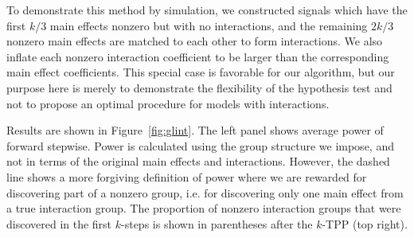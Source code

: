 \documentclass{imsart}
\begin{document}
To demonstrate this method by simulation, we constructed signals which have
the first $k/3$ main effects nonzero but with no interactions, and the
remaining $2k/3$ nonzero main effects are matched to each other to form
interactions.
We also inflate each nonzero interaction
coefficient to be larger than the corresponding main
effect coefficients. This special case is favorable for our algorithm,
but our purpose here is merely to demonstrate the flexibility of the
hypothesis test and not to propose an optimal procedure for models with
interactions.

Results are shown in Figure~\ref{fig:glint}. The left
panel shows average power of forward stepwise. Power is calculated
using the group structure we impose, and not in terms of the original
main effects and interactions. However, the dashed line shows a more
forgiving definition of power where we are rewarded for discovering part
of a nonzero group, i.e. for discovering only one main effect from a
true interaction group. The proportion of nonzero interaction groups
that were discovered in the first $k$-steps is shown in parentheses
after the $k$-TPP (top right).
\end{document}
